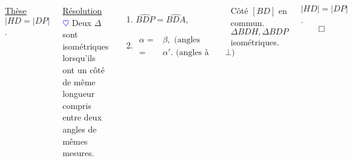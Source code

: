 \documentclass[10pt]{beamer}
\def \heart {\textcolor{blue}{$\heartsuit$} }
\begin{document}
{\begin{columns}[t]
\begin{tcolorbox}[basic]
				    \underline{Thèse} \\
				    \smallskip
				    $|HD=|DP| $.
				    \end{tcolorbox}
		
		
		\centering
		
		\underline{Résolution}\\ \flushleft
		\heart Deux $\Delta$ sont isométriques lorsqu'ils ont un côté de même longueur compris entre deux angles de mêmes mesures. \\ \medskip
		
		\begin{enumerate}
		 \item $\widehat{BDP}=\widehat{BDA}$,
		 \item \begin{align*}
		        \alpha =& \beta, \text{ (angles inscrits)} \\
			       =& \alpha '. \text{ (angles à côtés $\bot$)}      
		       \end{align*}
		\end{enumerate} \medskip
		Côté $[BD]$ en commun. \\ \bigskip
		$\Delta BDH,\Delta BDP$ isométriques. \\ \bigskip
		
		\centering 
		
		$|HD|=|DP|$.  \\
		\hfill $\qed$
		
		
		
		

   
	   \end{columns}
    
    
    
    }
	  
  
\end{document}
